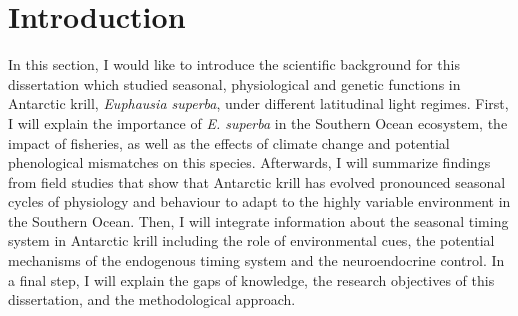 
\chapter{Introduction} %

\label{Intro} %


\newcommand{\keyword}[1]{\textbf{#1}}
\newcommand{\tabhead}[1]{\textbf{#1}}
\newcommand{\code}[1]{\texttt{#1}}
\newcommand{\file}[1]{\texttt{\bfseries#1}}
\newcommand{\option}[1]{\texttt{\itshape#1}}
\newcommand{\krilllatin}{\textit{Euphausia superba}}
\newcommand{\krilllatinshort}{\textit{E. superba}}

In this section, I would like to introduce the scientific background for this
dissertation which studied seasonal, physiological and genetic functions in
Antarctic krill, \textit{Euphausia superba}, under different latitudinal light
regimes. First, I will explain the importance of \textit{E. superba} in the
Southern Ocean ecosystem, the impact of fisheries, as well as the effects of
climate change and potential phenological mismatches on this species.
Afterwards, I will summarize findings from field studies that show that
Antarctic krill has evolved pronounced seasonal cycles of physiology and
behaviour to adapt to the highly variable environment in the Southern Ocean.
Then, I will integrate information about the seasonal timing system in
Antarctic krill including the role of environmental cues, the potential
mechanisms of the endogenous timing system and the neuroendocrine control. In a
final step, I will explain the gaps of knowledge, the research objectives of
this dissertation, and the methodological approach.


